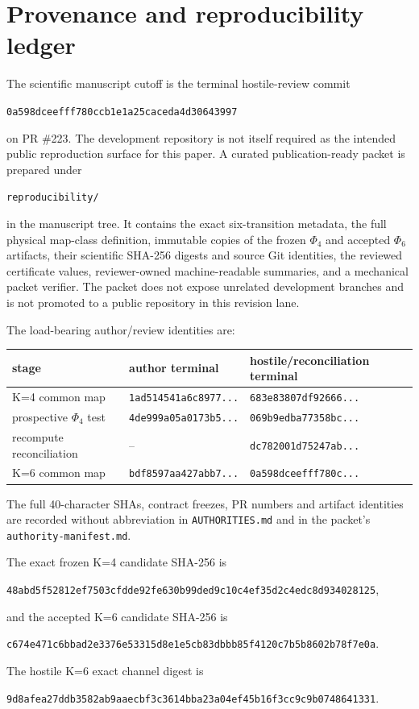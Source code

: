 \section{Provenance and reproducibility ledger}
\label{app:provenance}

The scientific manuscript cutoff is the terminal hostile-review commit
\begin{center}
\texttt{0a598dceefff780ccb1e1a25caceda4d30643997}
\end{center}
on PR \#223.  The development repository is not itself required as the intended public reproduction surface for this paper.  A curated publication-ready packet is prepared under
\begin{center}
\texttt{reproducibility/}
\end{center}
in the manuscript tree.  It contains the exact six-transition metadata, the full physical map-class definition, immutable copies of the frozen $\Phi_4$ and accepted $\Phi_6$ artifacts, their scientific SHA-256 digests and source Git identities, the reviewed certificate values, reviewer-owned machine-readable summaries, and a mechanical packet verifier.  The packet does not expose unrelated development branches and is not promoted to a public repository in this revision lane.

The load-bearing author/review identities are:
\begin{center}
\begin{tabular}{lll}
\toprule
stage & author terminal & hostile/reconciliation terminal\\
\midrule
K=4 common map & \texttt{1ad514541a6c8977...} & \texttt{683e83807df92666...}\\
prospective $\Phi_4$ test & \texttt{4de999a05a0173b5...} & \texttt{069b9edba77358bc...}\\
recompute reconciliation & -- & \texttt{dc782001d75247ab...}\\
K=6 common map & \texttt{bdf8597aa427abb7...} & \texttt{0a598dceefff780c...}\\
\bottomrule
\end{tabular}
\end{center}
The full 40-character SHAs, contract freezes, PR numbers and artifact identities are recorded without abbreviation in \texttt{AUTHORITIES.md} and in the packet's \texttt{authority-manifest.md}.

The exact frozen K=4 candidate SHA-256 is
\begin{center}
\texttt{48abd5f52812ef7503cfdde92fe630b99ded9c10c4ef35d2c4edc8d934028125},
\end{center}
and the accepted K=6 candidate SHA-256 is
\begin{center}
\texttt{c674e471c6bbad2e3376e53315d8e1e5cb83dbbb85f4120c7b5b8602b78f7e0a}.
\end{center}
The hostile K=6 exact channel digest is
\begin{center}
\texttt{9d8afea27ddb3582ab9aaecbf3c3614bba23a04ef45b16f3cc9c9b0748641331}.
\end{center}

